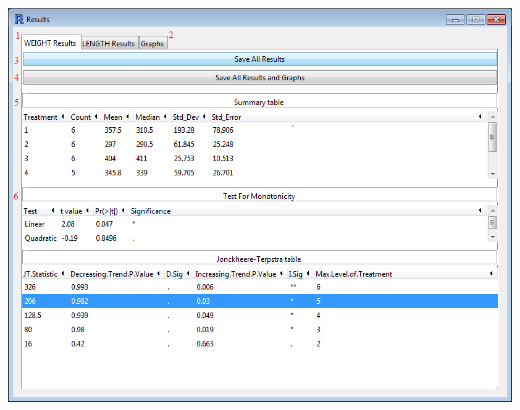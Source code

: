 \documentclass[a4paper]{article}
\begin{document}
\begin{center}
\hypertarget{fig:OEResults}{\includegraphics[width=\textwidth,keepaspectratio]{StandardAnl5.png}}
\end{center} 
\end{document}
